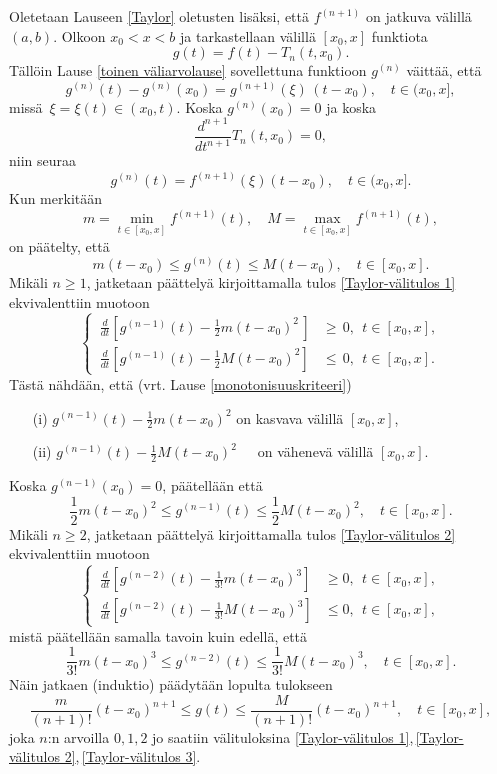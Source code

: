 \underline{} Oletetaan Lauseen \ref{Taylor} oletusten lisäksi, että
$f^{(n+1)}$ on jatkuva välillä $(a,b)$. Olkoon $x_0 <x < b$ ja tarkastellaan välillä $[x_0,x]$
funktiota
\[
g(t)=f(t)-T_n(t,x_0).
\]
Tällöin Lause \ref{toinen väliarvolause} sovellettuna funktioon $g^{(n)}$ väittää, että
\[
g^{(n)}(t)-g^{(n)}(x_0)=g^{(n+1)}(\xi)\,(t-x_0),\quad t\in (x_0,x],
\]
missä $\,\xi=\xi(t)\in (x_0,t)$. Koska $g^{(n)}(x_0)=0$ ja koska
\[
\frac{d^{n+1}}{dt^{n+1}}T_n(t,x_0)=0,
\]
niin seuraa
\[
g^{(n)}(t)=f^{(n+1)}(\xi)(t-x_0), \quad t\in (x_0,x].
\]
Kun merkitään
\[
m=\min_{t\in [x_0,x]} f^{(n+1)}(t), \quad M=\max_{t\in [x_0,x]} f^{(n+1)}(t),
\]
on päätelty, että
\begin{equation} \label{Taylor-välitulos 1}
m(t-x_0) \le g^{(n)}(t) \le M(t-x_0),\quad t\in [x_0,x].
\end{equation}
Mikäli $n\geq 1$, jatketaan päättelyä kirjoittamalla tulos \eqref{Taylor-välitulos 1} 
ekvivalenttiin muotoon
\[
\begin{cases}
\,\frac{d}{dt}[g^{(n-1)}(t)-\frac{1}{2}m(t-x_0)^2\,] &\ge\, 0,\ \ t\in [x_0,x], \\
\,\frac{d}{dt}[g^{(n-1)}(t)-\frac{1}{2}M(t-x_0)^2]   &\le\, 0,\ \ t\in [x_0,x].
\end{cases}
\]
Tästä nähdään, että (vrt. Lause \ref{monotonisuuskriteeri})
\begin{itemize}
\item[(i)] $g^{(n-1)}(t)-\frac{1}{2}m(t-x_0)^2$ \quad   on kasvava välillä $[x_0,x]$,
\item[(ii)] $g^{(n-1)}(t)-\frac{1}{2}M(t-x_0)^2$ \,\ \  on vähenevä välillä $[x_0,x]$.
\end{itemize}
Koska $g^{(n-1)}(x_0)=0$, päätellään että
\begin{equation} \label{Taylor-välitulos 2}
\frac{1}{2}m(t-x_0)^2\leq g^{(n-1)}(t)\leq \frac{1}{2}M(t-x_0)^2,\quad t\in [x_0,x].
\end{equation}
Mikäli $n \ge 2$, jatketaan päättelyä kirjoittamalla tulos \eqref{Taylor-välitulos 2} 
ekvivalenttiin muotoon
\[
\begin{cases}
\,\frac{d}{dt}[g^{(n-2)}(t)-\frac{1}{3!}m(t-x_0)^3] &\ge 0,\ \ t\in [x_0,x], \\
\,\frac{d}{dt}[g^{(n-2)}(t)-\frac{1}{3!}M(t-x_0)^3] &\le 0,\ \ t\in [x_0,x],
\end{cases}
\]
mistä päätellään samalla tavoin kuin edellä, että
\begin{equation} \label{Taylor-välitulos 3}
\frac{1}{3!}m(t-x_0)^3\leq g^{(n-2)}(t)\leq \frac{1}{3!}M(t-x_0)^3,\quad t\in [x_0,x].
\end{equation}
Näin jatkaen (induktio) päädytään lopulta tulokseen
\begin{equation} \label{Taylor-välitulos 4}
\frac{m}{(n+1)!}(t-x_0)^{n+1}\leq g(t)\leq \frac{M}{(n+1)!}(t-x_0)^{n+1},\quad t\in [x_0,x],
\end{equation}
joka $n$:n arvoilla $0,1,2$ jo saatiin välituloksina 
\eqref{Taylor-välitulos 1},\,\eqref{Taylor-välitulos 2},\,\eqref{Taylor-välitulos 3}.

